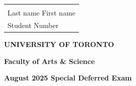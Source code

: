 \documentclass[14pt, oneside]{memoir}
\begin{document}
\begin{tabular}[t]{l}
	\hphantom{Last name Last nameLast nameLast name}\\[-15pt]	
	Last name  \dotfill  First name \dotfill  \\
	Student Number \dotfill  \\
\end{tabular}

\vskip 10pt

{\centering \textbf{UNIVERSITY OF TORONTO} \par}

{\centering \textbf{	Faculty of Arts \& Science} \par}

{\centering \textbf{     August 2025 Special Deferred Exam} \par}
\end{document}
